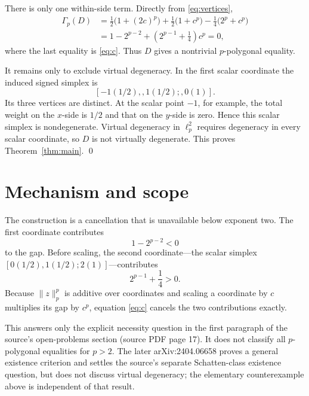 \documentclass[11pt]{article}
\newcommand{\gap}{\Gamma_p}
\begin{document}
There is only one within-side term.  Directly from \eqref{eq:vertices},
\begin{align*}
 \gap(D)
 &=\frac12\bigl(1+(2c)^p\bigr)
   +\frac12\bigl(1+c^p\bigr)
   -\frac14\bigl(2^p+c^p\bigr)\\
 &=1-2^{p-2}+\left(2^{p-1}+\frac14\right)c^p=0,
\end{align*}
where the last equality is \eqref{eq:c}.  Thus $D$ gives a nontrivial
$p$-polygonal equality.

It remains only to exclude virtual degeneracy.  In the first scalar
coordinate the induced signed simplex is
\[
 [-1(1/2),,1(1/2);,0(1)].
\]
Its three vertices are distinct.  At the scalar point $-1$, for example, the
total weight on the $x$-side is $1/2$ and that on the $y$-side is zero.  Hence
this scalar simplex is nondegenerate.  Virtual degeneracy in $\ell_p^2$
requires degeneracy in every scalar coordinate, so $D$ is not virtually
degenerate.  This proves Theorem~\ref{thm:main}. \qed

\section{Mechanism and scope}

The construction is a cancellation that is unavailable below exponent two.
The first coordinate contributes
\[
 1-2^{p-2}<0
\]
to the gap.  Before scaling, the second coordinate---the scalar simplex
$[0(1/2),1(1/2);2(1)]$---contributes
\[
 2^{p-1}+\frac14>0.
\]
Because $\|z\|_p^p$ is additive over coordinates and scaling a coordinate by
$c$ multiplies its gap by $c^p$, equation \eqref{eq:c} cancels the two
contributions exactly.

This answers only the explicit necessity question in the first paragraph of
the source's open-problems section (source PDF page 17).  It does not classify
all $p$-polygonal equalities for $p>2$.  The later arXiv:2404.06658 proves a
general existence criterion and settles the source's separate Schatten-class
existence question, but does not discuss virtual degeneracy; the elementary
counterexample above is independent of that result.
\end{document}
